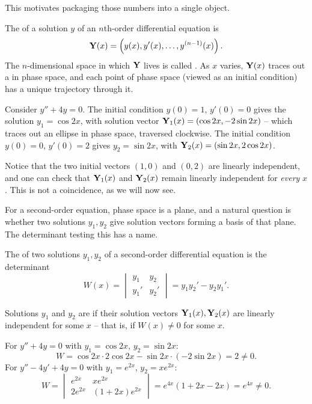 \documentclass[a4paper]{scrartcl}
\begin{document}
This motivates packaging those numbers into a single object.

\begin{definition}
	The  of a solution $y$ of an $n$th-order differential equation is
	$$
	\mathbf{Y}(x) = \left(y(x), y'(x), \dots, y^{(n - 1)}(x)\right).
	$$
	The $n$-dimensional space in which $\mathbf{Y}$ lives is called . As $x$ varies, $\mathbf{Y}(x)$ traces out a  in phase space, and each point of phase space (viewed as an initial condition) has a unique trajectory through it.
\end{definition}

\begin{example}
	Consider $y'' + 4y = 0$. The initial condition $y(0) = 1$, $y'(0) = 0$ gives the solution $y_1 = \cos 2x$, with solution vector $\mathbf{Y}_1(x) = (\cos 2x, -2\sin 2x)$ -- which traces out an ellipse in phase space, traversed clockwise. The initial condition $y(0) = 0$, $y'(0) = 2$ gives $y_2 = \sin 2x$, with $\mathbf{Y}_2(x) = (\sin 2x, 2\cos 2x)$.

	Notice that the two initial vectors $(1, 0)$ and $(0, 2)$ are linearly independent, and one can check that $\mathbf{Y}_1(x)$ and $\mathbf{Y}_2(x)$ remain linearly independent for \emph{every} $x$. This is not a coincidence, as we will now see.
\end{example}

For a second-order equation, phase space is a plane, and a natural question is whether two solutions $y_1, y_2$ give solution vectors forming a basis of that plane. The determinant testing this has a name.

\begin{definition}[Wronskian]
	The  of two solutions $y_1, y_2$ of a second-order differential equation is the determinant
	$$
	W(x) = \begin{vmatrix} y_1 & y_2 \\ y_1' & y_2' \end{vmatrix} = y_1 y_2' - y_2 y_1'.
	$$
\end{definition}

\begin{definition}
	Solutions $y_1$ and $y_2$ are  if their solution vectors $\mathbf{Y}_1(x), \mathbf{Y}_2(x)$ are linearly independent for some $x$ -- that is, if $W(x) \neq 0$ for some $x$.
\end{definition}

\begin{example}
	For $y'' + 4y = 0$ with $y_1 = \cos 2x$, $y_2 = \sin 2x$:
	$$
	W = \cos 2x \cdot 2 \cos 2x - \sin 2x \cdot (-2 \sin 2x) = 2 \neq 0.
	$$
	For $y'' - 4y' + 4y = 0$ with $y_1 = e^{2x}$, $y_2 = x e^{2x}$:
	$$
	W = \begin{vmatrix} e^{2x} & x e^{2x} \\ 2e^{2x} & (1 + 2x) e^{2x}\end{vmatrix} = e^{4x}(1 + 2x - 2x) = e^{4x} \neq 0.
	$$
\end{example}
\end{document}
